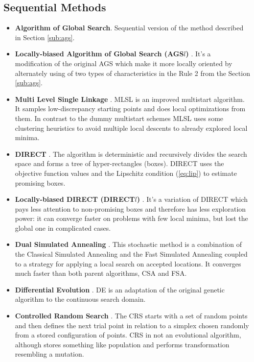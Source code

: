 \documentclass[runningheads]{llncs}
\begin{document}
\subsection{Sequential Methods}
\begin{itemize}
  \item \textbf{Algorithm of Global Search}. Sequential version of the method described in Section
\ref{sub:ags}.

  \item \textbf{Locally-biased Algorithm of Global Search (AGS\(l\))} \cite{indexMethod}. It's a
modification of
  the original AGS which make it more locally oriented by alternately using of two types of
characteristics in the Rule 2 from the Section \ref{sub:ags}.

  \item \textbf{Multi Level Single Linkage} \cite{Kan1987StochasticGO}. MLSL is an improved
multistart algorithm.
  It samples low-discrepancy starting points and does local optimizations from them. In contrast to
the dummy multistart schemes
  MLSL uses some clustering heuristics to avoid multiple local descents to already explored local
minima.

  \item \textbf{DIRECT} \cite{Jones2009}. The algorithm is deterministic and recursively divides
the search space and forms a tree of hyper-rectangles (boxes). DIRECT uses the objective function
values and the Lipschitz condition (\ref{eq:lip}) to estimate promising boxes.

  \item \textbf{Locally-biased DIRECT (DIRECT$l$)} \cite{Gablonsky2001}. It's a variation of
DIRECT which pays less attention to non-promising boxes and therefore
  has less exploration power: it can converge faster on problems with few local minima, but lost the
global one in complicated cases.

  \item \textbf{Dual Simulated Annealing} \cite{XIANG1997216}. This stochastic method is a
combination of the Classical Simulated Annealing and the Fast Simulated Annealing coupled to a
strategy for applying a local search on accepted locations. It converges much faster than both parent
algorithms, CSA and FSA.

  \item \textbf{Differential Evolution} \cite{Storn1997}. DE is an adaptation of the original genetic
algorithm to
  the continuous search domain.

  \item \textbf{Controlled Random Search} \cite{Price1983}. The CRS starts with a set of random
points and then defines
  the next trial point in relation to a simplex chosen randomly from a stored configuration of points.
CRS in not an
  evolutional algorithm, although stores something like population and performs transformation
resembling a mutation.


\end{itemize}
\end{document}
